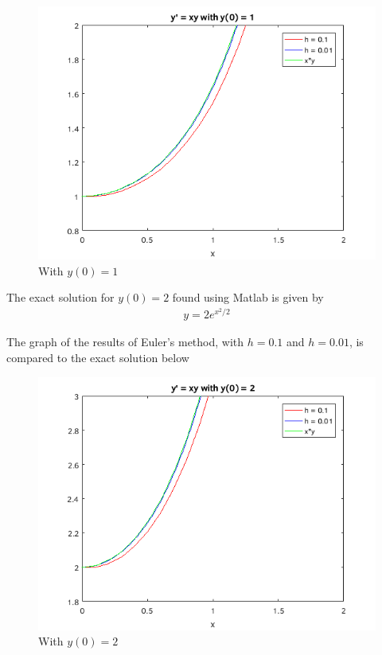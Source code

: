 \documentclass[a4paper,12pt]{article}
\begin{document}
\begin{enumerate}[I.]
\begin{enumerate}[a)]
      \begin{figure}[H]
        \begin{center}
          \includegraphics[scale=.9]{111.png}
          \caption{With $y(0)=1$}
        \end{center}
      \end{figure}
      
      The exact solution for $y(0)=2$ found using Matlab is given by
      \begin{align*}
        y = 2e^{x^2/2}
      \end{align*}
      
      The graph of the results of Euler's method, with $h=0.1$ and $h=0.01$, is compared to the exact solution below
      
      \begin{figure}[H]
        \begin{center}
          \includegraphics[scale=.9]{112.png}
          \caption{With $y(0) = 2$}
        \end{center}
      \end{figure}
      

\end{enumerate}
\end{enumerate}
\end{document}
